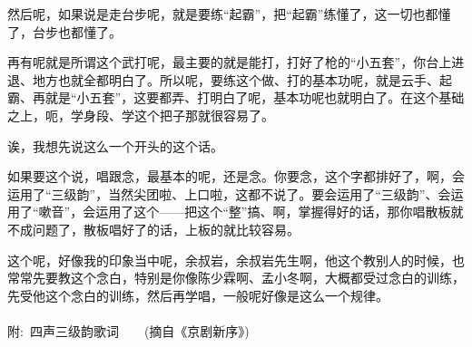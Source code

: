 \textrm{然后呢，如果说是走台步呢，就是要练``起霸''，把``起霸''练懂了，这一切也都懂了，台步也都懂了。}

\textrm{再有呢就是所谓这个武打呢，最主要的就是能打，打好了枪的``小五套''，你台上进退、地方也就全都明白了。所以呢，要练这个做、打的基本功呢，就是云手、起霸、再就是``小五套''，这要都弄、打明白了呢，基本功呢也就明白了。在这个基础之上，呃，学身段、学这个把子那就很容易了。}

\textrm{诶，我想先说这么一个开头的这个话。}

\textrm{如果要这个说，唱跟念，最基本的呢，还是念。你要念，这个字都排好了，啊，会运用了``三级韵''，当然尖团啦、上口啦，这都不说了。要会运用了``三级韵''、会运用了``嗽音''，会运用了这个------把这个``整''搞、啊，掌握得好的话，那你唱散板就不成问题了，散板唱好了的话，上板的就比较容易。}

\textrm{这个呢，好像我的印象当中呢，余叔岩，余叔岩先生啊，他这个教别人的时候，也常常先要教这个念白，特别是你像陈少霖啊、孟小冬啊，大概都受过念白的训练，先受他这个念白的训练，然后再学唱，一般呢好像是这么一个规律。}\\
\\
\vspace{7pt}
{\hei 附:~四声三级韵歌词~~~~(摘自《京剧新序》)}\\%
\vspace{3pt}
